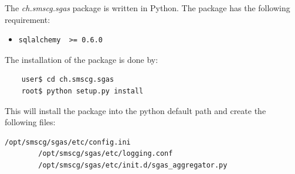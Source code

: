   The \emph{ch.smscg.sgas} package is written in Python. The package has the following requirement:
  \begin{itemize}
	\item \begin{verbatim}sqlalchemy  >= 0.6.0\end{verbatim}
\end{itemize}

\noindent The installation of the package is done by: 
 \begin{verbatim}
 	user$ cd ch.smscg.sgas
 	root$ python setup.py install
 \end{verbatim}
 
 \noindent This will install the package into the python default path and create the following files:
 \noindent
  \begin{verbatim}/opt/smscg/sgas/etc/config.ini
		/opt/smscg/sgas/etc/logging.conf
		/opt/smscg/sgas/etc/init.d/sgas_aggregator.py
 \end{verbatim}

